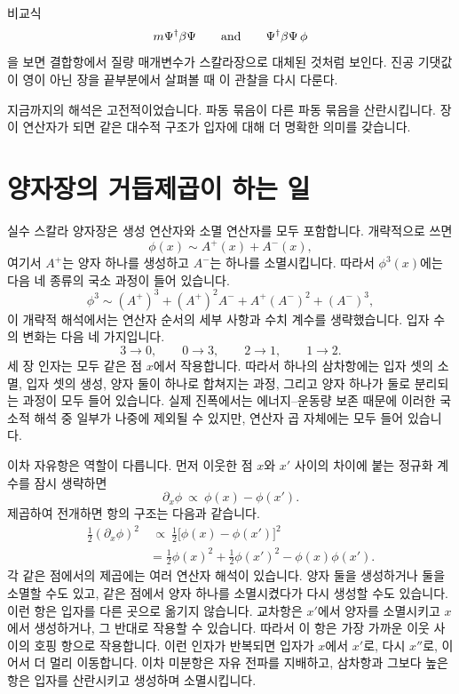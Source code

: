 비교식
\begin{equation}
m\Psi^\dagger\beta\Psi
\qquad\hbox{and}\qquad
\Psi^\dagger\beta\Psi\,\phi
\end{equation}
을 보면 결합항에서 질량 매개변수가 스칼라장으로 대체된 것처럼 보인다. 진공 기댓값이 영이 아닌 장을 끝부분에서 살펴볼 때 이 관찰을 다시 다룬다.

지금까지의 해석은 고전적이었습니다. 파동 묶음이 다른 파동 묶음을 산란시킵니다. 장이 연산자가 되면 같은 대수적 구조가 입자에 대해 더 명확한 의미를 갖습니다.

\section{양자장의 거듭제곱이 하는 일}

실수 스칼라 양자장은 생성 연산자와 소멸 연산자를 모두 포함합니다. 개략적으로 쓰면
\begin{equation}
\phi(x)\sim A^+(x)+A^-(x),
\end{equation}
여기서 \(A^+\)는 양자 하나를 생성하고 \(A^-\)는 하나를 소멸시킵니다. 따라서 \(\phi^3(x)\)에는 다음 네 종류의 국소 과정이 들어 있습니다.
\begin{equation}
\phi^3
\sim
(A^+)^3+(A^+)^2A^-+A^+(A^-)^2+(A^-)^3,
\end{equation}
이 개략적 해석에서는 연산자 순서의 세부 사항과 수치 계수를 생략했습니다. 입자 수의 변화는 다음 네 가지입니다.
\begin{equation}
3\longrightarrow0,
\qquad
0\longrightarrow3,
\qquad
2\longrightarrow1,
\qquad
1\longrightarrow2.
\end{equation}
세 장 인자는 모두 같은 점 \(x\)에서 작용합니다. 따라서 하나의 삼차항에는 입자 셋의 소멸, 입자 셋의 생성, 양자 둘이 하나로 합쳐지는 과정, 그리고 양자 하나가 둘로 분리되는 과정이 모두 들어 있습니다. 실제 진폭에서는 에너지--운동량 보존 때문에 이러한 국소적 해석 중 일부가 나중에 제외될 수 있지만, 연산자 곱 자체에는 모두 들어 있습니다.

이차 자유항은 역할이 다릅니다. 먼저 이웃한 점 \(x\)와 \(x'\) 사이의 차이에 붙는 정규화 계수를 잠시 생략하면
\begin{equation}
\partial_x\phi
\ \propto\
\phi(x)-\phi(x').
\end{equation}
제곱하여 전개하면 항의 구조는 다음과 같습니다.
\begin{align}
\frac12(\partial_x\phi)^2
&\ \propto\
\frac12\bigl[\phi(x)-\phi(x')\bigr]^2
\\
&=
\frac12\phi(x)^2
+\frac12\phi(x')^2
-\phi(x)\phi(x').
\end{align}
각 같은 점에서의 제곱에는 여러 연산자 해석이 있습니다. 양자 둘을 생성하거나 둘을 소멸할 수도 있고, 같은 점에서 양자 하나를 소멸시켰다가 다시 생성할 수도 있습니다. 이런 항은 입자를 다른 곳으로 옮기지 않습니다. 교차항은 \(x'\)에서 양자를 소멸시키고 \(x\)에서 생성하거나, 그 반대로 작용할 수 있습니다. 따라서 이 항은 가장 가까운 이웃 사이의 호핑 항으로 작용합니다. 이런 인자가 반복되면 입자가 \(x\)에서 \(x'\)로, 다시 \(x''\)로, 이어서 더 멀리 이동합니다. 이차 미분항은 자유 전파를 지배하고, 삼차항과 그보다 높은 항은 입자를 산란시키고 생성하며 소멸시킵니다.

